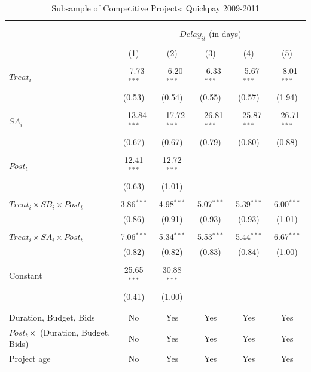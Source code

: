 \documentclass[
]{article}
\begin{document}
\begin{table}[H] \centering 
  \caption{Subsample of Competitive Projects: Quickpay 2009-2011} 
  \label{} 
\small 
\begin{tabular}{@{\extracolsep{-2pt}}lccccc} 
\\[-1.8ex]\hline 
\hline \\[-1.8ex] 
\\[-1.8ex] & \multicolumn{5}{c}{$Delay_{it}$ (in days)} \\ 
\\[-1.8ex] & (1) & (2) & (3) & (4) & (5)\\ 
\hline \\[-1.8ex] 
 $Treat_i$ & $-$7.73$^{***}$ & $-$6.20$^{***}$ & $-$6.33$^{***}$ & $-$5.67$^{***}$ & $-$8.01$^{***}$ \\ 
  & (0.53) & (0.54) & (0.55) & (0.57) & (1.94) \\ 
  & & & & & \\ 
 $SA_i$ & $-$13.84$^{***}$ & $-$17.72$^{***}$ & $-$26.81$^{***}$ & $-$25.87$^{***}$ & $-$26.71$^{***}$ \\ 
  & (0.67) & (0.67) & (0.79) & (0.80) & (0.88) \\ 
  & & & & & \\ 
 $Post_t$ & 12.41$^{***}$ & 12.72$^{***}$ &  &  &  \\ 
  & (0.63) & (1.01) &  &  &  \\ 
  & & & & & \\ 
 $Treat_i \times SB_i \times Post_t$ & 3.86$^{***}$ & 4.98$^{***}$ & 5.07$^{***}$ & 5.39$^{***}$ & 6.00$^{***}$ \\ 
  & (0.86) & (0.91) & (0.93) & (0.93) & (1.01) \\ 
  & & & & & \\ 
 $Treat_i \times SA_i \times Post_t$ & 7.06$^{***}$ & 5.34$^{***}$ & 5.53$^{***}$ & 5.44$^{***}$ & 6.67$^{***}$ \\ 
  & (0.82) & (0.82) & (0.83) & (0.84) & (1.00) \\ 
  & & & & & \\ 
 Constant & 25.65$^{***}$ & 30.88$^{***}$ &  &  &  \\ 
  & (0.41) & (1.00) &  &  &  \\ 
  & & & & & \\ 
\hline \\[-1.8ex] 
Duration, Budget, Bids & No & Yes & Yes & Yes & Yes \\ 
$Post_t \times $  (Duration, Budget, Bids) & No & Yes & Yes & Yes & Yes \\ 
Project age & No & Yes & Yes & Yes & Yes \\ 

\end{tabular}
\end{table}
\end{document}

